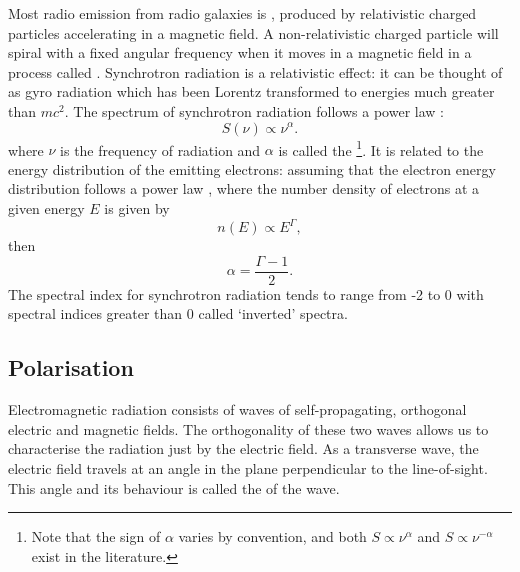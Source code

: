         Most radio emission from radio galaxies is , produced by relativistic charged particles accelerating in a magnetic field. A non-relativistic charged particle will spiral with a fixed angular frequency when it moves in a magnetic field in a process called . Synchrotron radiation is a relativistic effect: it can be thought of as gyro radiation which has been Lorentz transformed to energies much greater than $mc^2$. The spectrum of synchrotron radiation follows a power law \citep{condon_essential_2016}:
        \begin{equation}
            \label{eq:spectral-index}
            S(\nu) \propto \nu^{\alpha}.
        \end{equation}
        where $\nu$ is the frequency of radiation and $\alpha$ is called the \footnote{Note that the sign of $\alpha$ varies by convention, and both $S \propto \nu^{\alpha}$ and $S \propto \nu^{-\alpha}$ exist in the literature.}. It is related to the energy distribution of the emitting electrons: assuming that the electron energy distribution follows a power law \citep[which it generally does,][]{rybicki_radiative_2008}, where the number density of electrons at a given energy $E$ is given by
        \begin{equation}
            n(E) \propto E^\Gamma,
        \end{equation}
        then
        \begin{equation}
            \alpha = \frac{\Gamma - 1}{2}.
        \end{equation}
        The spectral index for synchrotron radiation tends to range from -2 to 0 \citep{condon_essential_2016} with spectral indices greater than 0 called `inverted' spectra.

    \subsection{Polarisation}
    \label{sec:polarisation}

        Electromagnetic radiation consists of waves of self-propagating, orthogonal electric and magnetic fields. The orthogonality of these two waves allows us to characterise the radiation just by the electric field. As a transverse wave, the electric field travels at an angle in the plane perpendicular to the line-of-sight. This angle and its behaviour is called the  of the wave.

